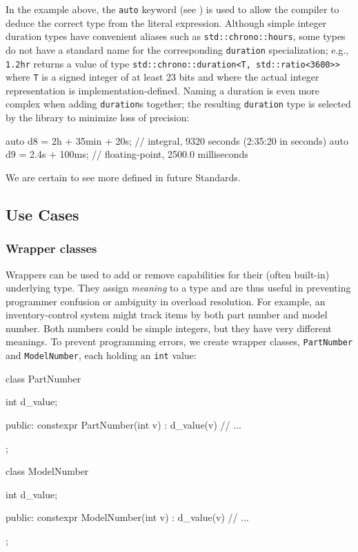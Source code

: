 \noindent In the example above, the \lstinline!auto! keyword (see ) is used to allow the compiler to deduce
the correct type from the literal expression. Although simple integer
duration types have convenient aliases such as
\lstinline!std::chrono::hours!, some types do not have a standard name for
the corresponding \lstinline!duration! specialization; e.g., \lstinline!1.2hr!
returns a value of type
\lstinline!std::chrono::duration<T, std::ratio<3600>>! where \lstinline!T! is a signed integer of at least 23 bits and 
where the actual integer representation is implementation-defined.
Naming a duration is even more complex when adding \lstinline!duration!s
together; the resulting \lstinline!duration! type is selected by the
library to minimize loss of precision:

\begin{emcppslisting}[emcppsbatch=e13]
auto d8 = 2h + 35min + 20s;  // integral, 9320 seconds (2:35:20 in seconds)
auto d9 = 2.4s + 100ms;       // floating-point, 2500.0 milliseconds
\end{emcppslisting}
    
\noindent We are certain to see more  defined in future
Standards.

\subsection[Use Cases]{Use Cases}\label{use-cases-userdeflit}

\subsubsection[Wrapper classes]{Wrapper classes}\label{wrapper-classes}

Wrappers can be used to add or remove capabilities for their (often
built-in) underlying type. They assign \emph{meaning} to a type and are
thus useful in preventing programmer confusion or ambiguity in overload
resolution. For example, an inventory-control system might track items
by both part number and model number. Both numbers could be simple
integers, but they have very different meanings. To prevent programming
errors, we create wrapper classes, \lstinline!PartNumber! and
\lstinline!ModelNumber!, each holding an \lstinline!int! value:

\begin{emcppslisting}[emcppsbatch=e14]
class PartNumber
{
    int d_value;

public:
    constexpr PartNumber(int v) : d_value(v) { }
    // ...
};

class ModelNumber
{
    int d_value;

public:
    constexpr ModelNumber(int v) : d_value(v) { }
    // ...
};
\end{emcppslisting}
    
